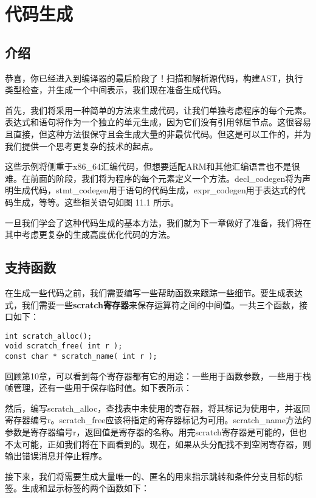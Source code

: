 \documentclass[cn,11pt,chinese]{elegantbook}
\begin{document}
\chapter{代码生成}

\section{介绍}

恭喜，你已经进入到编译器的最后阶段了！扫描和解析源代码，构建AST，执行类型检查，并生成一个中间表示，我们现在准备生成代码。

首先，我们将采用一种简单的方法来生成代码，让我们单独考虑程序的每个元素。表达式和语句将作为一个独立的单元生成，因为它们没有引用邻居节点。这很容易且直接，但这种方法很保守且会生成大量的非最优代码。但这是可以工作的，并为我们提供一个思考更复杂的技术的起点。

这些示例将侧重于x86\_64汇编代码，但想要适配ARM和其他汇编语言也不是很难。在前面的阶段，我们将为程序的每个元素定义一个方法。decl\_codegen将为声明生成代码，stmt\_codegen用于语句的代码生成，expr\_codegen用于表达式的代码生成，等等。这些相关语句如图 11.1 所示。

一旦我们学会了这种代码生成的基本方法，我们就为下一章做好了准备，我们将在其中考虑更复杂的生成高度优化代码的方法。

\section{支持函数}

在生成一些代码之前，我们需要编写一些帮助函数来跟踪一些细节。要生成表达式，我们需要一些\textbf{scratch寄存器}来保存运算符之间的中间值。一共三个函数，接口如下：

\begin{verbatim}
int scratch_alloc();
void scratch_free( int r );
const char * scratch_name( int r );
\end{verbatim}

回顾第10章，可以看到每个寄存器都有它的用途：一些用于函数参数，一些用于栈帧管理，还有一些用于保存临时值。如下表所示：

然后，编写scratch\_alloc，查找表中未使用的寄存器，将其标记为使用中，并返回寄存器编号r。scratch\_free应该将指定的寄存器标记为可用。scratch\_name方法的参数是寄存器编号r，返回值是寄存器的名称。用完scratch寄存器是可能的，但也不太可能，正如我们将在下面看到的。现在，如果从头分配找不到空闲寄存器，则输出错误消息并停止程序。

接下来，我们将需要生成大量唯一的、匿名的用来指示跳转和条件分支目标的标签。生成和显示标签的两个函数如下：
\end{document}
